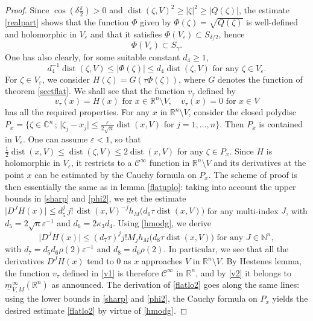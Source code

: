 \documentclass[a4paper]{amsart}
\theoremstyle{plain}
\theoremstyle{definition}
\theoremstyle{remark}
\DeclareMathOperator{\dist}{dist}
\newcommand{\imax}{\underline{m}}
\begin{document}
\begin{proof}
Since $ \cos(\delta\frac{\pi}{2})>0 $ and $ \dist(\zeta,V)^2\geq \vert\zeta\vert^2\geq\vert Q(\zeta)\vert $, the estimate \eqref{realpart} shows that
the function $ \Phi $ given by $ \Phi(\zeta)=\sqrt{Q(\zeta)} $
is well-defined and holomorphic in $ V_\varepsilon $ and that it satisfies $ \Phi(V_\varepsilon)\subset S_{\delta/2} $, hence
\begin{equation}\label{phi1}
\Phi(V_\varepsilon)\subset S_\gamma.
\end{equation}
One has also clearly, for some suitable constant $ d_4\geq 1 $, 
\begin{equation}\label{phi2}
d_4^{-1}\dist(\zeta,V)\leq \vert\Phi(\zeta)\vert\leq d_4\dist(\zeta,V)\text{ for any }\zeta\in V_\varepsilon.
\end{equation}
For $ \zeta\in V_\varepsilon $, we consider 
$ H(\zeta)=G(\tau\Phi(\zeta)) $, where $ G $ denotes the function
of theorem \ref{sectflat}. We shall see that the function
$ v_\tau $ defined by
\begin{equation}\label{v1}
v_\tau(x)=H(x) \text{ for } x\in\mathbb{R}^n\setminus V,\quad v_\tau(x)=0
\text{ for } x\in V
\end{equation}
has all the required properties. For any $ x $ in $ \mathbb{R}^n\setminus V $, consider the
closed polydisc $ P_x=\{\zeta\in\mathbb{C}^n\, ;\, \vert \zeta_j-x_j\vert\leq
\frac{\varepsilon}{2\sqrt{n}}\dist(x,V)\text{ for }j=1,\dots,n\}. $ Then $ P_x $ is contained in $ V_\varepsilon $. One can assume
$ \varepsilon<1 $, so that
$ \frac{1}{2}\dist(x,V)\leq \dist(\zeta,V)\leq 2\dist(x,V) $ for any $ \zeta\in P_x $. Since $ H $ is holomorphic in $ V_\varepsilon $, it
restricts to a $ \mathcal{C}^\infty $ function in $ \mathbb{R}^n\setminus V $ and its derivatives at the point $ x $ can be estimated by the Cauchy formula on $ P_x $. The scheme of proof is then essentially
the same as in lemma \ref{flatuplo}: taking into account the upper bounds in \eqref{sharp} and \eqref{phi2}, we get the estimate
$ \vert D^JH(x)\vert\leq d_5^j\, j!\, \dist(x,V)^{-j}
h_M\big(d_6\tau \dist(x,V)\big) $ for any multi-index $ J $, 
with $ d_5=2\sqrt{n}\varepsilon^{-1} $ and $ d_6=2\kappa_3d_4 $. Using \eqref{hmodg}, we derive 
\begin{equation}\label{v2}
\vert D^JH(x)\vert\leq (d_7\tau)^j j!M_j
h_M\big(d_8\tau \dist(x,V)\big)\text{ for any }J\in\mathbb{N}^n,
\end{equation}
with $ d_7=d_5d_6\rho(2)\varepsilon^{-1} $ and $ d_8=d_6\rho(2) $. In particular, we see
that all the derivatives $ D^JH(x) $ tend to $ 0 $ as $ x $ approaches $ V $ in $ \mathbb{R}^n\setminus V $.
By Hestenes lemma, the function $ v_\tau $ defined in \eqref{v1} is therefore
$ \mathcal{C}^\infty $ in $ \mathbb{R}^n $, and by \eqref{v2} it belongs to
$ \imax^\infty_{V,M}(\mathbb{R}^n) $ as announced.
The derivation of \eqref{flatlo2} goes along the same lines: using the lower bounds in
\eqref{sharp} and \eqref{phi2}, the Cauchy formula on $ P_x $ yields the
desired estimate \eqref{flatlo2} by virtue of \eqref{hmodg}.
\end{proof}
\end{document}
